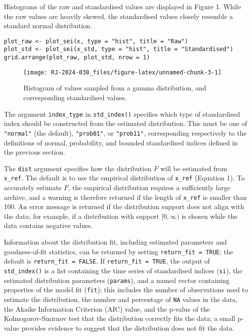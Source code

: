 Histograms of the raw and standardised values are displayed in Figure 1. While the raw values are heavily skewed, the standardised values closely resemble a standard normal distribution.

\begin{verbatim}
plot_raw <- plot_sei(x, type = "hist", title = "Raw")
plot_std <- plot_sei(x_std, type = "hist", title = "Standardised")
grid.arrange(plot_raw, plot_std, nrow = 1)
\end{verbatim}

\begin{figure}

{\centering \texttt{[image: RJ-2024-038\_files/figure-latex/unnamed-chunk-3-1]} 

}

\caption{Histogram of values sampled from a gamma distribution, and corresponding standardised values.}\label{fig:unnamed-chunk-3}
\end{figure}

The argument \texttt{index\_type} in \texttt{std\_index()} specifies which type of standardised index should be constructed from the estimated distribution. This must be one of \texttt{"normal"} (the default), \texttt{"prob01"}, or \texttt{"prob11"}, corresponding respectively to the definitions of normal, probability, and bounded standardised indices defined in the previous section.

The \texttt{dist} argument specifies how the distribution \(F\) will be estimated from \texttt{x\_ref}. The default is to use the empirical distribution of \texttt{x\_ref} (Equation 1). To accurately estimate \(F\), the empirical distribution requires a sufficiently large archive, and a warning is therefore returned if the length of \texttt{x\_ref} is smaller than 100. An error message is returned if the distribution support does not align with the data; for example, if a distribution with support \([0, \infty)\) is chosen while the data contains negative values.

Information about the distribution fit, including estimated parameters and goodness-of-fit statistics, can be returned by setting \texttt{return\_fit\ =\ TRUE}; the default is \texttt{return\_fit\ =\ FALSE}. If \texttt{return\_fit\ =\ TRUE}, the output of \texttt{std\_index()} is a list containing the time series of standardised indices (\texttt{si}), the estimated distribution parameters (\texttt{params}), and a named vector containing properties of the model fit (\texttt{fit}); this includes the number of observations used to estimate the distribution, the number and percentage of \texttt{NA} values in the data, the Akaike Information Criterion (AIC) value, and the p-value of the Kolmogorov-Smirnov test that the distribution correctly fits the data; a small p-value provides evidence to suggest that the distribution does not fit the data.

